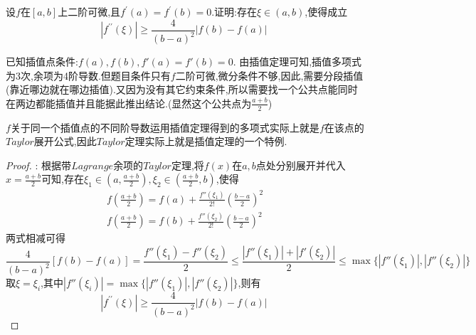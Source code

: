 \documentclass[lang=cn,newtx,10pt,scheme=chinese]{../Template/elegantbook}
\begin{document}
\begin{exercise}
    设\(f\)在\([a,b]\)上二阶可微,且\(f^{\prime}(a)=f^{\prime}(b)=0\).证明:存在\(\xi\in(a,b)\),使得成立
    \begin{equation}
        \left| f^{\prime\prime}(\xi ) \right|\ge \frac{4}{(b-a)^2}\left| f(b)-f(a) \right|\
        \nonumber
    \end{equation}
    \begin{note}
    已知插值点条件:$f(a),f(b),f'(a)=f'(b)=0$.
    由插值定理可知,插值多项式为3次,余项为4阶导数.但题目条件只有$f$二阶可微,微分条件不够,因此,需要分段插值(靠近哪边就在哪边插值).又因为没有其它约束条件,所以需要找一个公共点能同时在两边都能插值并且能据此推出结论.(显然这个公共点为$\frac{a+b}{2}$)
\end{note}
\begin{remark}
        $f$关于同一个插值点的不同阶导数运用插值定理得到的多项式实际上就是$f$在该点的$Taylor$展开公式,因此$Taylor$定理实际上就是插值定理的一个特例.
\end{remark}
    \begin{proof}
    {\color{blue} }:
    根据带$Lagrange$余项的$Taylor$定理,将$f(x)$在$a,b$点处分别展开并代入$x=\frac{a+b}{2}$可知,存在$\xi_1\in(a,\frac{a+b}{2}),\xi_2\in(\frac{a+b}{2},b)$,使得
    \begin{gather}
    f(\frac{a+b}{2})=f(a)+\frac{f''(\xi_1)}{2!}(\frac{b-a}{2})^2
    \nonumber
    \\
    f(\frac{a+b}{2})=f(b)+\frac{f''(\xi_2)}{2!}(\frac{b-a}{2})^2
    \nonumber
    \end{gather}
    两式相减可得
    \begin{equation}
    \frac{4}{(b-a)^2}[f(b)-f(a)]=\frac{f''(\xi_1)-f''(\xi_2)}{2}\leqslant \frac{|f''(\xi_1)|+|f'(\xi_2)|}{2}\leqslant \max\{|f''(\xi_1)|,|f''(\xi_2)|\}
        \nonumber
    \end{equation}
    取$\xi=\xi_i$,其中$|f''(\xi_i)|= \max\{|f''(\xi_1)|,|f''(\xi_2)|\}$,则有
    \begin{equation}
\left| f^{\prime\prime}(\xi ) \right|\ge \frac{4}{(b-a)^2}\left| f(b)-f(a) \right|\
        \nonumber
    \end{equation}
    

\end{proof}
\end{exercise}
\end{document}
